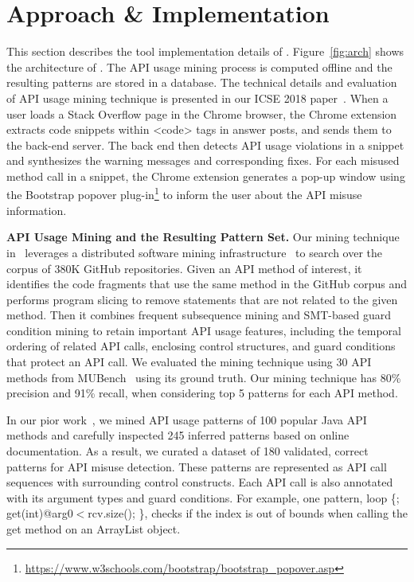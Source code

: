 \section{Approach \& Implementation}
\label{sec:implementation}

This section describes the tool implementation details of {\tool}. Figure~\ref{fig:arch} shows the architecture of {\tool}. 
The API usage mining process is computed offline and the resulting patterns are stored in a database. The technical details and evaluation of API usage mining technique is presented in our ICSE 2018 paper~\cite{zhang2018code}. When a user loads a Stack Overflow page in the Chrome browser, the Chrome extension extracts code snippets within {\ttt <code>} tags in answer posts, and sends them to the back-end server. The back end then detects API usage violations in a snippet and synthesizes the warning messages and corresponding fixes. For each misused method call in a snippet, the Chrome extension generates a pop-up window using the Bootstrap popover plug-in\footnote{\url{https://www.w3schools.com/bootstrap/bootstrap_popover.asp}} to inform the user about the API misuse information.

{\bf API Usage Mining and the Resulting Pattern Set.} Our mining technique in~\cite{zhang2018code} leverages a distributed software mining infrastructure~\cite{dyer2013boa} to search over the corpus of 380K GitHub repositories. Given an API method of interest, it identifies the code fragments that use the same method in the GitHub corpus and performs program slicing to remove statements that are not related to the given method. Then it combines frequent subsequence mining and SMT-based guard condition mining to retain important API usage features, including the temporal
ordering of related API calls, enclosing control structures, and guard conditions that protect an API call. We evaluated the mining technique using 30 API methods from MUBench~\cite{amani2016mubench} using its ground truth. Our mining technique has 80\% precision and 91\% recall, when considering top 5 patterns for each API method.

In our pior work~\cite{zhang2018code}, we mined API usage patterns of 100 popular Java API methods and carefully inspected 245 inferred patterns based on online documentation. As a result, we curated a dataset of 180 validated, correct patterns for API misuse detection. These patterns are represented as API call sequences with surrounding control constructs. Each API call is also annotated with its argument types and guard conditions. For example, one pattern, {\ttt loop \{; get(int)@arg0$<$rcv.size(); \}}, checks if the index is out of bounds when calling the {\ttt get} method on an {\ttt ArrayList} object. %

